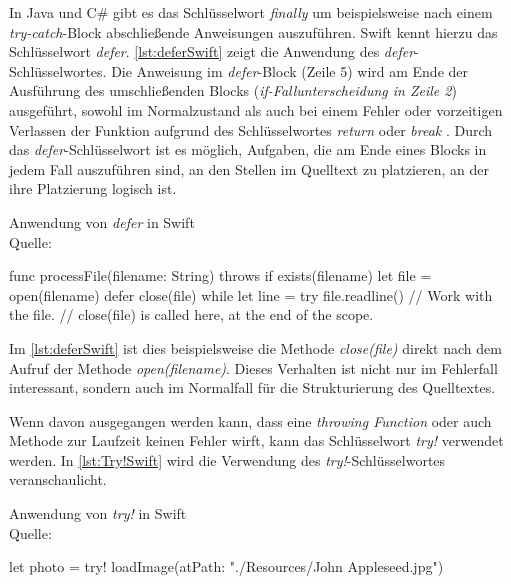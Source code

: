 In Java und C\# gibt es das Schlüsselwort \textit{finally} um beispielsweise nach einem \textit{try-catch}-Block abschließende Anweisungen auszuführen. 
Swift kennt hierzu das Schlüsselwort \textit{defer}.
\autoref{lst:deferSwift} zeigt die Anwendung des \textit{defer}-Schlüsselwortes.
Die Anweisung im \textit{defer}-Block (Zeile 5) wird am Ende der Ausführung des umschließenden Blocks (\textit{if-Fallunterscheidung in Zeile 2}) ausgeführt, sowohl im Normalzustand als auch bei einem Fehler oder vorzeitigen Verlassen der Funktion aufgrund des Schlüsselwortes \textit{return} oder \textit{break} \cite[S.317]{Apple.2017}.
Durch das \textit{defer}-Schlüsselwort ist es möglich, Aufgaben, die am Ende eines Blocks in jedem Fall auszuführen sind, an den Stellen im Quelltext zu platzieren, an der ihre Platzierung logisch ist.

\begin{listing}[H]
\caption{Anwendung von \textit{defer} in Swift \\ Quelle: \cite[S.318]{Apple.2017}}
\label{lst:deferSwift}
\begin{SwiftCode}
func processFile(filename: String) throws {
    if exists(filename) {
        let file = open(filename)
        defer {
            close(file)
        }
        while let line = try file.readline() {
            // Work with the file.
        }
        // close(file) is called here, at the end of the scope.
    }
}
\end{SwiftCode}
\end{listing}

Im \autoref{lst:deferSwift} ist dies beispielsweise die Methode \textit{close(file)} direkt nach dem Aufruf der Methode \textit{open(filename)}. 
Dieses Verhalten ist nicht nur im Fehlerfall interessant, sondern auch im Normalfall für die Strukturierung des Quelltextes. 

Wenn davon ausgegangen werden kann, dass eine \textit{throwing Function} oder auch Methode zur Laufzeit keinen Fehler wirft, kann das Schlüsselwort \textit{try!} verwendet werden.
In \autoref{lst:Try!Swift} wird die Verwendung des \textit{try!}-Schlüsselwortes veranschaulicht.

\begin{listing}[H]
\caption{Anwendung von \textit{try!} in Swift \\ Quelle: \cite[S.317]{Apple.2017}}
\label{lst:Try!Swift}
\begin{SwiftCode}
let photo = try! loadImage(atPath: "./Resources/John Appleseed.jpg")
\end{SwiftCode}
\end{listing}

